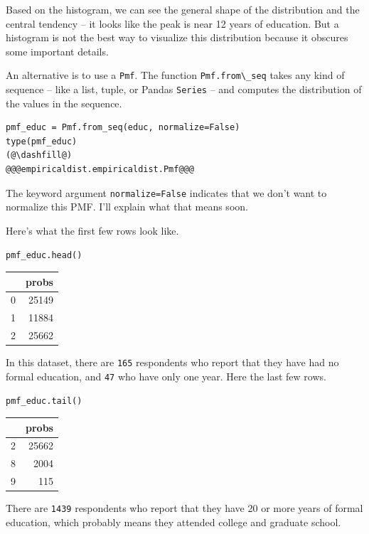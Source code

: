 Based on the histogram, we can see the general shape of the distribution
and the central tendency -- it looks like the peak is near 12 years of
education. But a histogram is not the best way to visualize this
distribution because it obscures some important details.

An alternative is to use a \passthrough{\lstinline!Pmf!}. The function
\passthrough{\lstinline!Pmf.from\_seq!} takes any kind of sequence --
like a list, tuple, or Pandas \passthrough{\lstinline!Series!} -- and
computes the distribution of the values in the sequence.

\begin{lstlisting}[]
pmf_educ = Pmf.from_seq(educ, normalize=False)
type(pmf_educ)
(@\dashfill@)
@@@empiricaldist.empiricaldist.Pmf@@@
\end{lstlisting}

The keyword argument \passthrough{\lstinline!normalize=False!} indicates
that we don't want to normalize this PMF. I'll explain what that means
soon.

Here's what the first few rows look like.

\begin{lstlisting}[]
pmf_educ.head()
\end{lstlisting}

\begin{tabular}{lr}
\midrule
{} &  probs \\
\midrule
0 &  25149 \\
1 &  11884 \\
2 &  25662 \\
\midrule
\end{tabular}

In this dataset, there are \passthrough{\lstinline!165!} respondents who
report that they have had no formal education, and
\passthrough{\lstinline!47!} who have only one year. Here the last few
rows.

\begin{lstlisting}[]
pmf_educ.tail()
\end{lstlisting}

\begin{tabular}{lr}
\midrule
{} &  probs \\
\midrule
2 &  25662 \\
8 &   2004 \\
9 &    115 \\
\midrule
\end{tabular}

There are \passthrough{\lstinline!1439!} respondents who report that
they have 20 or more years of formal education, which probably means
they attended college and graduate school.

